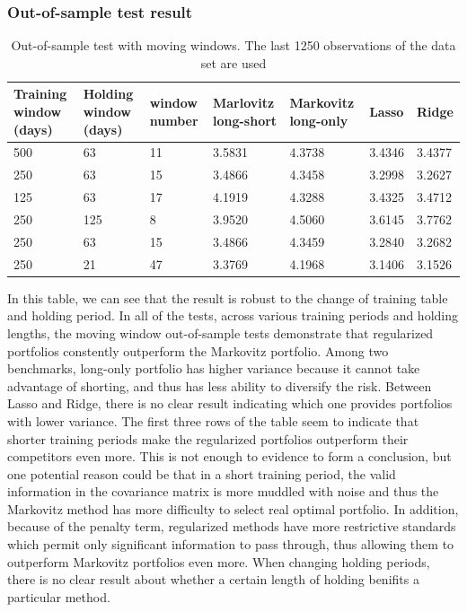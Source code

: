 \documentclass{article}
\begin{document}
\subsubsection*{\centering{}Out-of-sample test result}

\begin{table}[H]
    \caption{Out-of-sample test with moving windows. The last 1250
    observations of the data set are used}
    \begin{center}\begin{tabular}{|l|l|l|l|l|l|l|}
    \hline
    Training window (days) & Holding window (days) & window number & Marlovitz long-short & Markovitz long-only & Lasso & Ridge \\ \hline
    500 & 63 & 11  & 3.5831 & 4.3738 & 3.4346 & 3.4377 \\ \hline
    250 & 63 & 15  & 3.4866 & 4.3458 & 3.2998 & 3.2627 \\ \hline
    125 & 63 & 17  & 4.1919 & 4.3288 & 3.4325 & 3.4712 \\ \hline
    250 & 125 & 8  & 3.9520 & 4.5060 & 3.6145 & 3.7762 \\ \hline
    250 & 63 & 15  & 3.4866 & 4.3459 & 3.2840 & 3.2682 \\ \hline
    250 & 21 & 47  & 3.3769 & 4.1968 & 3.1406 & 3.1526 \\ \hline
    \end{tabular}\end{center}
\end{table}

In this table, we can see that the result is robust to the change of
training table and holding period. In all of the tests, across various training
periods
and holding lengths, the moving window out-of-sample tests demonstrate that
regularized portfolios constently outperform the Markovitz portfolio. Among
two benchmarks, long-only portfolio has higher variance because it cannot
take advantage of shorting, and thus has less ability to diversify the risk. Between
Lasso and Ridge, there is no clear result indicating which one provides portfolios
with lower variance. The first three rows of the table seem to indicate that
shorter training periods make the regularized portfolios outperform their
competitors even more.
This is not enough to evidence to form a conclusion, but one potential reason could be
that in a short training period, the valid information in the covariance matrix
is more muddled with noise and thus the Markovitz method has more difficulty
to select real optimal portfolio. In addition, because of the penalty term, regularized
methods have more restrictive standards which permit only significant information to
pass through, thus allowing them to outperform Markovitz portfolios even more.
When changing holding periods, there is no clear result about whether a certain
length of holding benifits a particular method.
\end{document}
